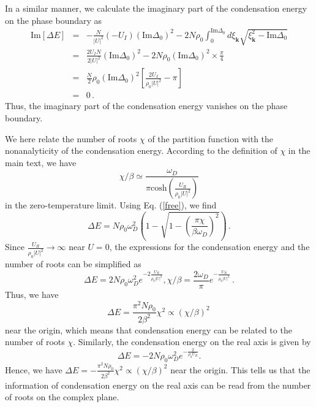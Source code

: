 \documentclass[aps,onecolumn,superscriptaddress,notitlepage,longbibliography]{revtex4-1}
\begin{document}
In a similar manner, we calculate the imaginary part of the condensation energy on the phase boundary as
\begin{eqnarray}
  \text{Im} [\Delta E] & = & - \frac{N}{| U |^2} \left( - U_I \right)
  \left( \text{Im} \Delta_0 \right)^2 - 2 N \rho_0 \int_0^{\text{Im} \Delta_0}
  d \xi_{\bm{k}} \sqrt{\xi_{\bm{k}}^2 - \text{Im} \Delta_0} \nonumber\\
  & = & \frac{2U_I N}{2 | U |^2} \left( \text{Im} \Delta_0 \right)^2 - 2 N
  \rho_0 \left( \text{Im} \Delta_0 \right)^2 \times \frac{\pi}{4} \nonumber\\
  & = & \frac{N}{2} \rho_0 \left( \text{Im} \Delta_0 \right)^2 \left[
  \frac{2U_I}{\rho_0 | U |^2} - \pi \right] \nonumber\\
  & = & 0 \,.
\end{eqnarray}
Thus, the imaginary part of the condensation energy vanishes on the phase boundary. 

We here relate the number of roots $\chi$ of the partition function with the nonanalyticity of the condensation energy. According to the definition of $\chi$ in the main text, we have
\begin{equation}
    \chi / \beta \simeq\frac{\omega_D}{\pi\text{cosh}(\frac{U_R}{\rho_0|U|^2})}
\end{equation}
in the zero-temperature limit. Using Eq. (\ref{free}), we find
\begin{equation}
    \Delta E=N\rho_0\omega_D^2(1-\sqrt{1-(\frac{\pi\chi}{\beta\omega_D})^2})\,.
\end{equation}
Since $\frac{U_R}{\rho_0|U|^2}\rightarrow\infty$ near $U=0$, the expressions for the condensation energy and the number of roots can be simplified as
\begin{equation}
    \Delta E=2N \rho_0 \omega_D^2 e^{-2\frac{U_R}{\rho_0|U|^2}},\chi/\beta=\frac{2\omega_D}{\pi}e^{-\frac{U_R}{\rho_0|U|^2}}\,.
\end{equation}
Thus, we have
\begin{equation}
    \Delta E=\frac{\pi^2N\rho_0}{2\beta^2}\chi^2\propto(\chi/\beta)^2\,
\end{equation}
near the origin, which means that condensation energy can be related to the number of roots $\chi$. Similarly, the condensation energy on the real axis is given by
\begin{equation}
	\Delta E=-2N \rho_0 \omega_D^2 e^{-\frac{2}{\rho_0 U_R}}.
\end{equation}
Hence, we have $\Delta E=-\frac{\pi^2N\rho_0}{2\beta^2}\chi^2\propto(\chi/\beta)^2$ near the origin. This tells us that the information of condensation energy on the real axis can be read from the number of roots on the complex plane.
\end{document}
